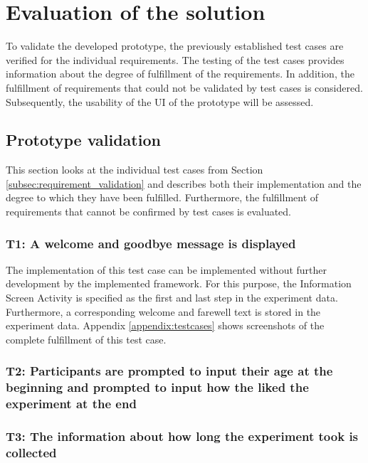 \newpage\section{Evaluation of the solution}

To validate the developed prototype, the previously established test cases are verified for the individual requirements. The testing of the test cases provides information about the degree of fulfillment of the requirements. In addition, the fulfillment of requirements that could not be validated by test cases is considered. Subsequently, the usability of the UI of the prototype will be assessed.

\subsection{Prototype validation}
This section looks at the individual test cases from Section \ref{subsec:requirement_validation} and describes both their implementation and the degree to which they have been fulfilled. Furthermore, the fulfillment of requirements that cannot be confirmed by test cases is evaluated. 

\subsubsection*{T1: A welcome and goodbye message is displayed} 

The implementation of this test case can be implemented without further development by the implemented framework. For this purpose, the Information Screen Activity is specified as the first and last step in the experiment data. Furthermore, a corresponding welcome and farewell text is stored in the experiment data. Appendix \ref{appendix:testcases} shows screenshots of the complete fulfillment of this test case.



\subsubsection*{T2: Participants are prompted to input their age at the beginning and prompted to input how the liked the experiment at the end}

\subsubsection*{T3: The information about how long the experiment took is collected}

